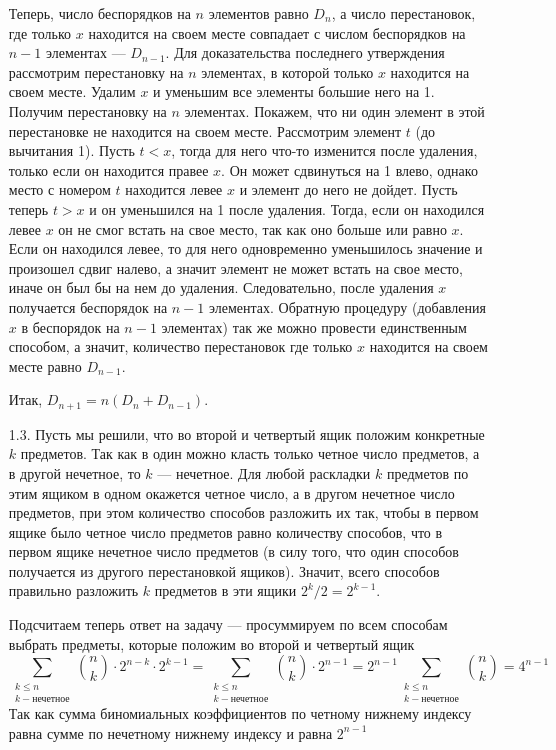\documentclass[10pt]{article}
\newcommand{\dsum}{\sum_{\substack{ k\le n \\ k - \text{нечетное}}}}
\begin{document}
\begin{enumerate}
Теперь, число беспорядков на $n$ элементов равно $D_n$, а число перестановок, где только $x$ находится на своем месте совпадает с числом беспорядков на $n-1$ элементах --- $D_{n-1}$. Для доказательства последнего утверждения рассмотрим перестановку на $n$ элементах, в которой только $x$ находится на своем месте. Удалим $x$ и уменьшим все элементы большие него на 1. Получим перестановку на $n$ элементах. Покажем, что ни один элемент в этой перестановке не находится на своем месте. Рассмотрим элемент $t$ (до вычитания 1). Пусть $t<x$, тогда для него что-то изменится после удаления, только если он находится правее $x$. Он может сдвинуться на 1 влево, однако место с номером $t$ находится левее $x$ и элемент до него не дойдет. Пусть теперь $t>x$ и он уменьшился на 1 после удаления. Тогда, если он находился левее $x$ он не смог встать на свое место, так как оно больше или равно $x$. Если он находился левее, то для него одновременно уменьшилось значение и произошел сдвиг налево, а значит элемент не может встать на свое место, иначе он был бы на нем до удаления. Следовательно, после удаления $x$ получается беспорядок на $n-1$ элементах. Обратную процедуру (добавления $x$ в беспорядок на $n-1$ элементах) так же можно провести единственным способом, а значит, количество перестановок где только $x$ находится на своем месте равно $D_{n-1}$.

Итак, $D_{n+1} = n(D_n + D_{n-1})$.


\item[1.3.] Пусть мы решили, что во второй и четвертый ящик положим конкретные $k$ предметов. Так как в один можно класть только четное число предметов, а в другой нечетное, то $k$ --- нечетное. Для любой раскладки $k$ предметов по этим ящиком в одном окажется четное число, а в другом нечетное число предметов, при этом количество способов разложить их так, чтобы в первом ящике было четное число предметов равно количеству способов, что в первом ящике нечетное число предметов (в силу того, что один способов получается из другого перестановкой ящиков). Значит, всего способов правильно разложить $k$ предметов в эти ящики $2^k / 2 = 2^{k-1}$.

Подсчитаем теперь ответ на задачу --- просуммируем по всем способам выбрать предметы, которые положим во второй и четвертый ящик
$$ \dsum \binom{n}{k} \cdot 2^{n-k} \cdot 2^{k-1} = \dsum \binom{n}{k} \cdot 2^{n-1} = 2^{n-1} \dsum \binom{n}{k} = 4^{n-1}$$
Так как сумма биномиальных коэффициентов по четному нижнему индексу равна сумме по нечетному нижнему индексу и равна $2^{n-1}$


\end{enumerate}
\end{document}
